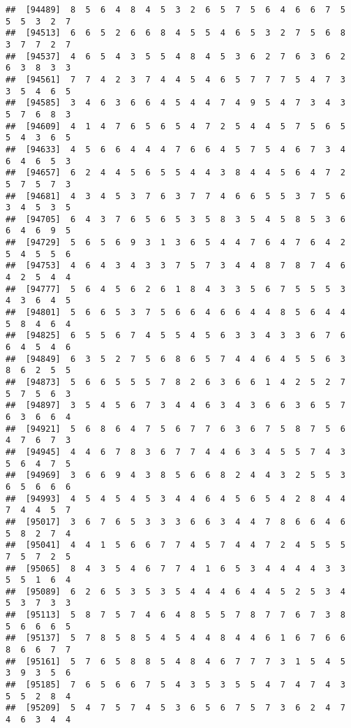 \documentclass[
]{book}
\begin{document}
\begin{verbatim}
##  [94489]  8  5  6  4  8  4  5  3  2  6  5  7  5  6  4  6  6  7  5  5  5  3  2  7
##  [94513]  6  6  5  2  6  6  8  4  5  5  4  6  5  3  2  7  5  6  8  3  7  7  2  7
##  [94537]  4  6  5  4  3  5  5  4  8  4  5  3  6  2  7  6  3  6  2  6  3  8  3  3
##  [94561]  7  7  4  2  3  7  4  4  5  4  6  5  7  7  7  5  4  7  3  3  5  4  6  5
##  [94585]  3  4  6  3  6  6  4  5  4  4  7  4  9  5  4  7  3  4  3  5  7  6  8  3
##  [94609]  4  1  4  7  6  5  6  5  4  7  2  5  4  4  5  7  5  6  5  5  4  3  6  5
##  [94633]  4  5  6  6  4  4  4  7  6  6  4  5  7  5  4  6  7  3  4  6  4  6  5  3
##  [94657]  6  2  4  4  5  6  5  5  4  4  3  8  4  4  5  6  4  7  2  5  7  5  7  3
##  [94681]  4  3  4  5  3  7  6  3  7  7  4  6  6  5  5  3  7  5  6  3  4  5  3  5
##  [94705]  6  4  3  7  6  5  6  5  3  5  8  3  5  4  5  8  5  3  6  6  4  6  9  5
##  [94729]  5  6  5  6  9  3  1  3  6  5  4  4  7  6  4  7  6  4  2  5  4  5  5  6
##  [94753]  4  6  4  3  4  3  3  7  5  7  3  4  4  8  7  8  7  4  6  4  2  5  4  4
##  [94777]  5  6  4  5  6  2  6  1  8  4  3  3  5  6  7  5  5  5  3  4  3  6  4  5
##  [94801]  5  6  6  5  3  7  5  6  6  4  6  6  4  4  8  5  6  4  4  5  8  4  6  4
##  [94825]  6  5  5  6  7  4  5  5  4  5  6  3  3  4  3  3  6  7  6  6  4  5  4  6
##  [94849]  6  3  5  2  7  5  6  8  6  5  7  4  4  6  4  5  5  6  3  8  6  2  5  5
##  [94873]  5  6  6  5  5  5  7  8  2  6  3  6  6  1  4  2  5  2  7  5  7  5  6  3
##  [94897]  3  5  4  5  6  7  3  4  4  6  3  4  3  6  6  3  6  5  7  6  3  6  6  4
##  [94921]  5  6  8  6  4  7  5  6  7  7  6  3  6  7  5  8  7  5  6  4  7  6  7  3
##  [94945]  4  4  6  7  8  3  6  7  7  4  4  6  3  4  5  5  7  4  3  5  6  4  7  5
##  [94969]  3  6  6  9  4  3  8  5  6  6  8  2  4  4  3  2  5  5  3  6  5  6  6  6
##  [94993]  4  5  4  5  4  5  3  4  4  6  4  5  6  5  4  2  8  4  4  7  4  4  5  7
##  [95017]  3  6  7  6  5  3  3  3  6  6  3  4  4  7  8  6  6  4  6  5  8  2  7  4
##  [95041]  4  4  1  5  6  6  7  7  4  5  7  4  4  7  2  4  5  5  5  7  5  7  2  5
##  [95065]  8  4  3  5  4  6  7  7  4  1  6  5  3  4  4  4  4  3  3  5  5  1  6  4
##  [95089]  6  2  6  5  3  5  3  5  4  4  4  6  4  4  5  2  5  3  4  5  3  7  3  3
##  [95113]  5  8  7  5  7  4  6  4  8  5  5  7  8  7  7  6  7  3  8  5  6  6  6  5
##  [95137]  5  7  8  5  8  5  4  5  4  4  8  4  4  6  1  6  7  6  6  8  6  6  7  7
##  [95161]  5  7  6  5  8  8  5  4  8  4  6  7  7  7  3  1  5  4  5  3  9  3  5  6
##  [95185]  7  6  5  6  6  7  5  4  3  5  3  5  5  4  7  4  7  4  3  5  5  2  8  4
##  [95209]  5  4  7  5  7  4  5  3  6  5  6  7  5  7  3  6  2  4  7  4  6  3  4  4

\end{verbatim}
\end{document}

